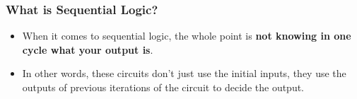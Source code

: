 \documentclass{beamer}
\begin{document}
   		\begin{frame}
   			\frametitle{What is Sequential Logic?}
   			\begin{itemize}
   				\item When it comes to sequential logic, the whole point is \textbf{not knowing in one cycle what your output is}.
   				\item In other words, these circuits don't just use the initial inputs, they use the outputs of previous iterations of the circuit to decide the output.
   			\end{itemize}
   			
   			{\centering
   			
   			


\begin{tikzpicture}[x=0.75pt,y=0.75pt,yscale=-1,xscale=1]


\end{tikzpicture}}
\end{frame}
\end{document}

